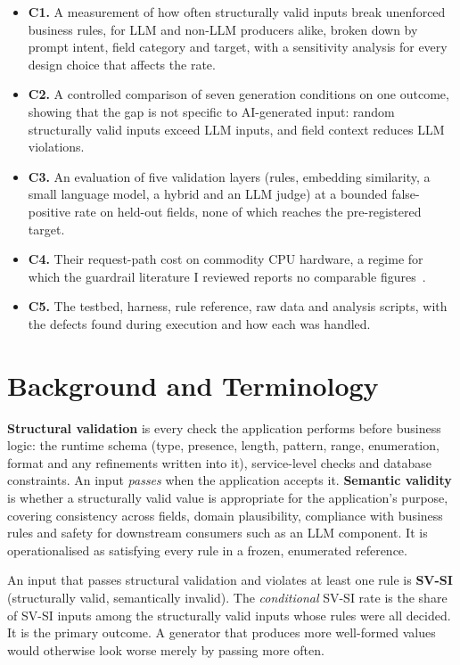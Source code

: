 \documentclass[conference]{IEEEtran}
\begin{document}
\begin{itemize}
  \item \textbf{C1.} A measurement of how often structurally valid inputs break unenforced business
  rules, for LLM and non-LLM producers alike, broken down by prompt intent, field category and target,
  with a sensitivity analysis for every design choice that affects the rate.
  \item \textbf{C2.} A controlled comparison of seven generation conditions on one outcome, showing
  that the gap is not specific to AI-generated input: random structurally valid inputs exceed LLM
  inputs, and field context reduces LLM violations.
  \item \textbf{C3.} An evaluation of five validation layers (rules, embedding similarity, a small
  language model, a hybrid and an LLM judge) at a bounded false-positive rate on held-out fields, none
  of which reaches the pre-registered target.
  \item \textbf{C4.} Their request-path cost on commodity CPU hardware, a regime for which the
  guardrail literature I reviewed reports no comparable
  figures~\cite{jacob2025promptshield,ahmed2026reflexguard,saleem2026layered,wang2026sokguardrails}.
  \item \textbf{C5.} The testbed, harness, rule reference, raw data and analysis scripts, with the
  defects found during execution and how each was handled.
\end{itemize}

\section{Background and Terminology}
\label{sec:background}

\textbf{Structural validation} is every check the application performs before business logic: the
runtime schema (type, presence, length, pattern, range, enumeration, format and any refinements written
into it), service-level checks and database constraints. An input \emph{passes} when the application
accepts it. \textbf{Semantic validity} is whether a structurally valid value is appropriate for the
application's purpose, covering consistency across fields, domain plausibility, compliance with business
rules and safety for downstream consumers such as an LLM component. It is operationalised as satisfying
every rule in a frozen, enumerated reference.

An input that passes structural validation and violates at least one rule is \textbf{SV-SI}
(structurally valid, semantically invalid). The \emph{conditional} SV-SI rate is the share of SV-SI
inputs among the structurally valid inputs whose rules were all decided. It is the primary outcome. A
generator that produces more well-formed values would otherwise look worse merely by passing more
often.
\end{document}

